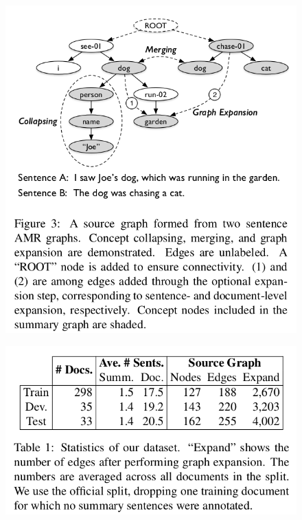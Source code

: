 \documentclass[xcolor={table}]{beamer}
\begin{document}
\begin{frame}{\cite{liu2015toward}}
\begin{figure}[h]
\centering
\includegraphics[scale=.25]{images/figure3-liu15} \\
\end{figure}
\end{frame}

\begin{frame}{\cite{liu2015toward}}
\begin{figure}[h]
\centering
\includegraphics[scale=.25]{images/table1-liu15} \\
\end{figure}
\end{frame}
\end{document}
